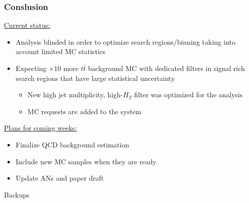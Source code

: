 \documentclass{beamer}
\begin{document}

\begin{frame}
\frametitle{Conslusion}
\underline{Current status:}
\begin{itemize}
\item Analysis blinded in order to optimize search regions/binning taking into account limited MC statistics
\item Expecting $\times 10$ more $t\bar{t}$ background MC with dedicated filters in signal rich search regions that have large statistical uncertainty
\begin{itemize}
\item New high jet multiplicity, high-$H_T$ filter was optimized for the analysis
\item MC requests are added to the system
\end{itemize}
\end{itemize}
\underline{Plans for coming weeks:}
\begin{itemize}
\item Finalize QCD background estimation
\item Include new MC samples when they are ready
\item Update ANs and paper draft 
\end{itemize}
\end{frame}





\begin{frame}
\center
{\huge Backups}
\end{frame}

\end{document}
